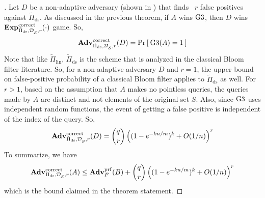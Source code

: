 \begin{proof}[]
Let $D$ be a non-adaptive adversary (shown in ) that finds ~$r$ false positives against $\tilde{\Pi}_{\mathrm{ds}}$. As discussed in the previous theorem, if $A$ wins $\text{G3}$, then $D$ wins $\mathrm{\mathbf{Exp}}^{\mathrm{correct}}_{\tilde{\Pi}_{\mathrm{ds}},\mathcal{D}_{{\cal S}}^{},r}(\cdot)$ game. So, 
\begin{equation*}
\mathrm{\mathbf{Adv}}^{\mathrm{correct}}_{\tilde{\Pi}_{\mathrm{ds}},\mathcal{D}_{{\cal S}}^{},r}(D) = \Pr\left[\: \text{G3}(A) = 1 \:\right]\label{eq:2T8}
\end{equation*}
Note that like $\tilde{\Pi}_{\mathrm{lin}}$, $\tilde{\Pi}_{\mathrm{ds}}$ is the scheme that is analyzed in the classical Bloom filter literature. So, for a non-adaptive adversary $D$ and $r=1$, the upper bound on false-positive probability of a classical Bloom filter applies to $\tilde{\Pi}_{\mathrm{ds}}$ as well. For $r > 1$, based on the assumption that $A$ makes no pointless queries, the queries made by $A$ are distinct and not elements of the original set $S$. Also, since $\text{G3}$ uses independent random functions, the event of getting a false positive is independent of the index of the query. So,
\begin{equation*}
\mathrm{\mathbf{Adv}}^{\mathrm{correct}}_{\tilde{\Pi}_{\mathrm{ds}},\mathcal{D}_{{\cal S}}^{},r}(D) =   {\dbinom{q}{r}} \left( (1-e^{-kn/m})^k + O(1/n) \right)^r
\end{equation*}
\noindent
To summarize, we have
\[
\mathrm{\mathbf{Adv}}^{\mathrm{correct}}_{\Pi_{\mathrm{ds}},\mathcal{D}_{{\cal S}}^{},r}(A) \leq  \mathbf{Adv}^{\mathrm{prf}}_{F}(B)  + {\dbinom{q}{r}} \left( (1-e^{-kn/m})^k + O(1/n) \right)^r
\]
which is the bound claimed in the theorem statement. %


\end{proof}
